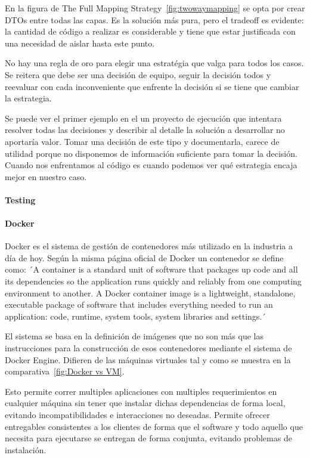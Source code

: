 En la figura de The Full Mapping Strategy~\cref{fig:twowaymapping} se opta por crear DTOs entre todas las capas. Es la solución más pura, pero el tradeoff es evidente: la cantidad de código a realizar es considerable y tiene que estar justificada con una necesidad de aislar hasta este punto.

No hay una regla de oro para elegir una estratégia que valga para todos los casos. Se reitera que debe ser una decisión de equipo, seguir la decisión todos y reevaluar con cada inconveniente que enfrente la decisión si se tiene que cambiar la estrategia.

Se puede ver el primer ejemplo en el un proyecto de ejecución que intentara resolver todas las decisiones y describir al detalle la solución a desarrollar no aportaría valor. Tomar una decisión de este tipo y documentarla, carece de utilidad porque no disponemos de información suficiente para tomar la decisión. Cuando nos enfrentamos al código es cuando podemos ver qué estrategia encaja mejor en nuestro caso.

\paragraph{Testing}
    

\paragraph{Docker}

Docker es el sistema de gestión de contenedores más utilizado en la industria a día de hoy.
Según la misma página oficial de Docker un contenedor se define como: ´A container is a standard unit of software that packages up code and all its dependencies so the application runs quickly and reliably from one computing environment to another.
A Docker container image is a lightweight, standalone, executable package of software that includes everything needed to run an application: code, runtime, system tools, system libraries and settings.´~\cite{docker}

El sistema se basa en la definición de imágenes que no son más que las instrucciones para la construcción de esos contenedores mediante el sistema de Docker Engine.
Difieren de las máquinas virtuales tal y como se muestra en la comparativa~\cref{fig:Docker vs VM}.

Esto permite correr multiples aplicaciones con multiples requerimientos en cualquier máquina sin tener que instalar dichas dependencias de forma local, evitando incompatibilidades e interacciones no deseadas.
Permite ofrecer entregables consistentes a los clientes de forma que el software y todo aquello que necesita para ejecutarse se entregan de forma conjunta, evitando problemas de instalación.

